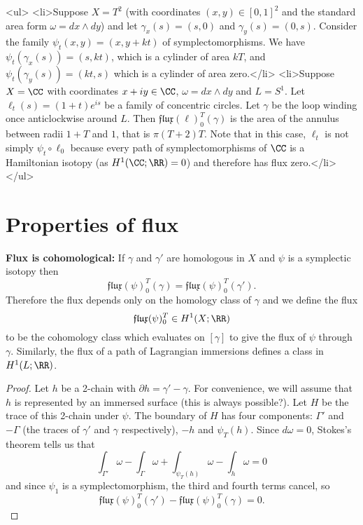 \documentclass{article}
\begin{document}
\begin{Example}
  <ul>
  <li>Suppose $X=T^2$ (with coordinates $(x,y)\in[0,1]^2$ and the standard area form $\omega=dx\wedge dy$) and let $\gamma_x(s)=(s,0)$ and $\gamma_y(s)=(0,s)$. Consider the family $\psi_t(x,y)=(x,y+kt)$ of symplectomorphisms. We have $\psi_t(\gamma_x(s))=(s,kt)$, which is a cylinder of area $kT$, and $\psi_t(\gamma_y(s))=(kt,s)$ which is a cylinder of area zero.</li>
  <li>Suppose $X=\CC$ with coordinates $x+iy\in\CC$, $\omega=dx\wedge dy$ and $L=S^1$. Let $\ell_t(s)=(1+t)e^{is}$ be a family of concentric circles. Let $\gamma$ be the loop winding once anticlockwise around $L$. Then $\mathfrak{flux}(\ell)_0^T(\gamma)$ is the area of the annulus between radii $1+T$ and $1$, that is $\pi (T+2)T$. Note that in this case, $\ell_t$ is not simply $\psi_t\circ\ell_0$ because every path of symplectomorphisms of $\CC$ is a Hamiltonian isotopy (as $H^1(\CC;\RR)=0$) and therefore has flux zero.</li>
</ul>
\end{Example}

\section{Properties of flux}

\begin{Lemma}[lmafluxwdf]
  {\bf Flux is cohomological:} If $\gamma$ and $\gamma'$ are homologous in $X$ and $\psi$ is a symplectic isotopy then
  \[\mathfrak{flux}(\psi)_0^T(\gamma)=\mathfrak{flux}(\psi)_0^T(\gamma').\]
  Therefore the flux depends only on the homology class of $\gamma$ and we define the flux
  \[\mathfrak{flux}(\psi)_0^T\in H^1(X;\RR)\]
  to be the cohomology class which evaluates on $[\gamma]$ to give the flux of $\psi$ through $\gamma$. Similarly, the flux of a path of Lagrangian immersions defines a class in $H^1(L;\RR)$.
\end{Lemma}
\begin{proof}
  Let $h$ be a 2-chain with $\partial h=\gamma'-\gamma$. For convenience, we will assume that $h$ is represented by an immersed surface (this is always possible?). Let $H$ be the trace of this 2-chain under $\psi$. The boundary of $H$ has four components: $\Gamma'$ and $-\Gamma$ (the traces of $\gamma'$ and $\gamma$ respectively), $-h$ and $\psi_T(h)$. Since $d\omega=0$, Stokes's theorem tells us that
  \[\int_{\Gamma'}\omega-\int_{\Gamma}\omega+\int_{\psi_T(h)}\omega-\int_h\omega=0\]
  and since $\psi_1$ is a symplectomorphism, the third and fourth terms cancel, so
  \[\mathfrak{flux}(\psi)_0^T(\gamma')-\mathfrak{flux}(\psi)_0^T(\gamma)=0.\]
\end{proof}
\end{document}
